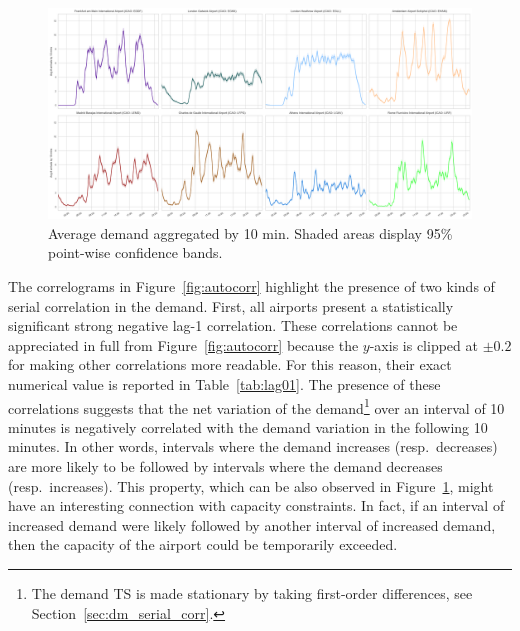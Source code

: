 \documentclass[draft,review]{elsarticle}
\begin{document}
\begin{figure}
  \includegraphics[width=\textwidth]{AvgArrivals}
  \caption{Average demand aggregated by 10 min. Shaded areas display 95\% point-wise confidence bands.}\label{fig:AvgArrivals}
\end{figure}

The correlograms in Figure~\ref{fig:autocorr} highlight the presence of two kinds of serial correlation in the demand.
First, all airports present a statistically significant strong negative lag-1 correlation.
These correlations cannot be appreciated in full from Figure~\ref{fig:autocorr} because the \(y\)-axis is clipped at \(\pm 0.2\) for making other correlations more readable. For this reason, their exact numerical value is reported in Table~\ref{tab:lag01}.
The presence of these correlations suggests that the net variation of the demand\footnote{The demand \ac{TS} is made stationary by taking first-order differences, see Section~\ref{sec:dm_serial_corr}.} over an interval of 10 minutes is negatively correlated with the demand variation in the following 10 minutes.
In other words, intervals where the demand increases (resp.\ decreases) are more likely to be followed by intervals where the demand decreases (resp.\ increases).
This property, which can be also observed in Figure~\ref{fig:AvgArrivals}, might have an interesting connection with capacity constraints.
In fact, if an interval of increased demand were likely followed by another interval of increased demand, then the capacity of the airport could be temporarily exceeded.
\end{document}
